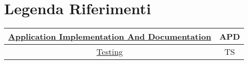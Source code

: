 \section{Legenda Riferimenti}
\label{secD4:LegendaRiferimenti}


\begin{tabular}{|c|c|}
    \hline
    \hyperref[secD4:ApplicationImplementationAndDocumentation]{Application Implementation And Documentation} & APD \\
    \hline
    \hyperref[secD4:Testing]{Testing}                                                                        & TS  \\
    \hline
\end{tabular}